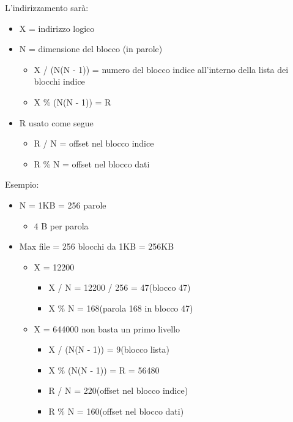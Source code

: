 \documentclass[a4paper, 12pt]{book}
\begin{document}
L'indirizzamento sarà:
\begin{itemize}
    \item X = indirizzo logico
    \item N = dimensione del blocco (in parole)
    \begin{itemize}
        \item X / (N(N - 1)) = numero del blocco indice 
        all'interno della lista dei blocchi indice
        \item X \% (N(N - 1)) = R 
    \end{itemize}
    \item R usato come segue
    \begin{itemize}
        \item R / N = offset nel blocco indice
        \item R \% N = offset nel blocco dati
    \end{itemize}
\end{itemize}

Esempio:
\begin{itemize}
    \item N = 1KB = 256 parole
    \begin{itemize}
        \item 4 B per parola
    \end{itemize}
    \item Max file = 256 blocchi da 1KB = 256KB
    \begin{itemize}
        \item X = 12200
        \begin{itemize}
            \item X / N = 12200 / 256 = 47(blocco 47)
            \item X \% N = 168(parola 168 in blocco 47)
        \end{itemize}
        \item X = 644000 non basta un primo livello
        \begin{itemize}
            \item X / (N(N - 1)) = 9(blocco lista)
            \item X \% (N(N - 1)) = R = 56480
            \item R / N = 220(offset nel blocco indice)
            \item R \% N = 160(offset nel blocco dati)
        \end{itemize}
    \end{itemize}
\end{itemize}
\end{document}
